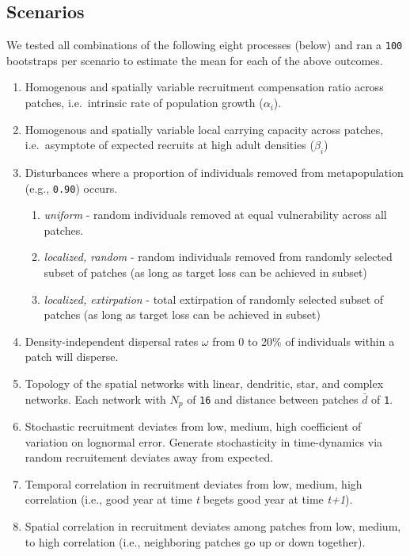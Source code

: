\documentclass[]{article}
\providecommand{\tightlist}{%
  \setlength{\itemsep}{0pt}\setlength{\parskip}{0pt}}
\begin{document}
\hypertarget{scenarios}{%
\subsection{Scenarios}\label{scenarios}}

We tested all combinations of the following eight processes (below) and
ran a \texttt{100} bootstraps per scenario to estimate the mean for each
of the above outcomes.

\begin{enumerate}
\def\labelenumi{\arabic{enumi}.}
\item
  Homogenous and spatially variable recruitment compensation ratio
  across patches, i.e.~intrinsic rate of population growth
  (\(\alpha_i\)).
\item
  Homogenous and spatially variable local carrying capacity across
  patches, i.e.~asymptote of expected recruits at high adult densities
  (\(\beta_i\))
\item
  Disturbances where a proportion of individuals removed from
  metapopulation (e.g., \texttt{0.90}) occurs.

  \begin{enumerate}
  \def\labelenumii{\alph{enumii}.}
  \tightlist
  \item
    \emph{uniform} - random individuals removed at equal vulnerability
    across all patches.
  \item
    \emph{localized, random} - random individuals removed from randomly
    selected subset of patches (as long as target loss can be achieved
    in subset)
  \item
    \emph{localized, extirpation} - total extirpation of randomly
    selected subset of patches (as long as target loss can be achieved
    in subset)
  \end{enumerate}
\item
  Density-independent dispersal rates \(\omega\) from 0 to 20\% of
  individuals within a patch will disperse.
\item
  Topology of the spatial networks with linear, dendritic, star, and
  complex networks. Each network with \(N_p\) of \texttt{16} and
  distance between patches \(\bar{d}\) of \texttt{1}.
\item
  Stochastic recruitment deviates from low, medium, high coefficient of
  variation on lognormal error. Generate stochasticity in time-dynamics
  via random recruitement deviates away from expected.
\item
  Temporal correlation in recruitment deviates from low, medium, high
  correlation (i.e., good year at time \emph{t} begets good year at time
  \emph{t+1}).
\item
  Spatial correlation in recruitment deviates among patches from low,
  medium, to high correlation (i.e., neighboring patches go up or down
  together).
\end{enumerate}
\end{document}
